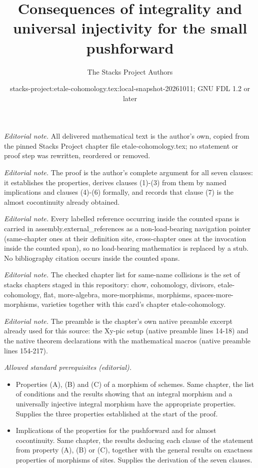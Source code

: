 \documentclass[10pt,a4paper]{amsart}
\title{Consequences of integrality and universal injectivity for the small pushforward}
\author{The Stacks Project Authors}
\date{stacks-project:etale-cohomology.tex:local-snapshot-20261011; GNU FDL 1.2 or later}
\theoremstyle{plain}
\theoremstyle{definition}
\theoremstyle{remark}
\numberwithin{equation}{subsection}
\begin{document}
\maketitle
\noindent\textit{Editorial note.} All delivered mathematical text is the author's own, copied from the pinned Stacks Project chapter file etale-cohomology.tex; no statement or proof step was rewritten, reordered or removed.\par\medskip
\noindent\textit{Editorial note.} The proof is the author's complete argument for all seven clauses: it establishes the properties, derives clauses (1)-(3) from them by named implications and clauses (4)-(6) formally, and records that clause (7) is the almost cocontinuity already obtained.\par\medskip
\noindent\textit{Editorial note.} Every labelled reference occurring inside the counted spans is carried in assembly.external\_references as a non-load-bearing navigation pointer (same-chapter ones at their definition site, cross-chapter ones at the invocation inside the counted span), so no load-bearing mathematics is replaced by a stub. No bibliography citation occurs inside the counted spans.\par\medskip
\noindent\textit{Editorial note.} The checked chapter list for same-name collisions is the set of stacks chapters staged in this repository: chow, cohomology, divisors, etale-cohomology, flat, more-algebra, more-morphisms, morphisms, spaces-more-morphisms, varieties together with this card's chapter etale-cohomology.\par\medskip
\noindent\textit{Editorial note.} The preamble is the chapter's own native preamble excerpt already used for this source: the Xy-pic setup (native preamble lines 14-18) and the native theorem declarations with the mathematical macros (native preamble lines 154-217).\par\medskip
\noindent\textit{Allowed standard prerequisites (editorial).}\begin{itemize}
\item Properties (A), (B) and (C) of a morphism of schemes. Same chapter, the list of conditions and the results showing that an integral morphism and a universally injective integral morphism have the appropriate properties. Supplies the three properties established at the start of the proof.
\item Implications of the properties for the pushforward and for almost cocontinuity. Same chapter, the results deducing each clause of the statement from property (A), (B) or (C), together with the general results on exactness properties of morphisms of sites. Supplies the derivation of the seven clauses.
\end{itemize}\medskip
\end{document}
